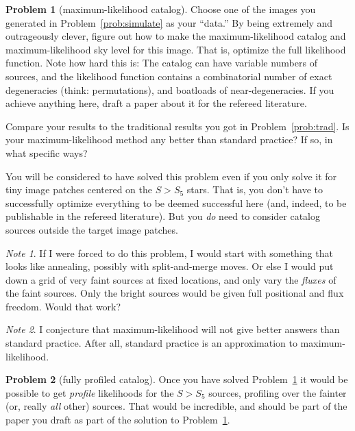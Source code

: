 \documentclass{article}
\theoremstyle{definition}
\newcommand{\problemname}{Problem}
\newtheorem{problem}{\problemname}
\newcommand{\probref}[1]{\problemname~\ref{#1}}
\theoremstyle{remark}
\newcommand{\notename}{Note}
\newtheorem{note}{\notename}[problem]
\begin{document}
\begin{problem}[maximum-likelihood catalog]\label{prob:mlcatalog}
Choose one of the images you generated in \probref{prob:simulate} as your ``data.''
By being extremely and outrageously clever, figure out how to make the maximum-likelihood catalog and maximum-likelihood sky level for this image.
That is, optimize the full likelihood function.
Note how hard this is: The catalog can have variable numbers of sources, and the likelihood function contains a combinatorial number of exact degeneracies (think: permutations), and boatloads of near-degeneracies.
If you achieve anything here, draft a paper about it for the refereed literature.

Compare your results to the traditional results you got in \probref{prob:trad}.
Is your maximum-likelihood method any better than standard practice?
If so, in what specific ways?

You will be considered to have solved this problem even if you only solve it for tiny image patches centered on the $S>S_5$ stars.
That is, you don't have to successfully optimize everything to be deemed successful here (and, indeed, to be publishable in the refereed literature).
But you \emph{do} need to consider catalog sources outside the target image patches.
\end{problem}

\begin{note}
If I were forced to do this problem, I would start with something that looks like annealing, possibly with split-and-merge moves.
Or else I would put down a grid of very faint sources at fixed locations, and only vary the \emph{fluxes} of the faint sources.
Only the bright sources would be given full positional and flux freedom.
Would that work?
\end{note}

\begin{note}
I conjecture that maximum-likelihood will not give better answers than standard practice.
After all, standard practice is an approximation to maximum-likelihood.
\end{note}

\begin{problem}[fully profiled catalog]\label{prob:fullprofile}
Once you have solved \probref{prob:mlcatalog} it would be possible to get \emph{profile} likelihoods for the $S>S_5$ sources, profiling over the fainter (or, really \emph{all} other) sources.
That would be incredible, and should be part of the paper you draft as part of the solution to \probref{prob:mlcatalog}.
\end{problem}
\end{document}
